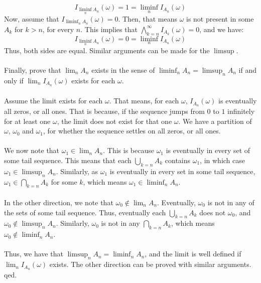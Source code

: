 \documentclass[12pt,a4paper]{article}
\newcommand{\1}[1]{\mathbbm{1}\left\{ #1 \right\}}
\begin{document}
$$
	I_{\liminf_n A_n}(\omega) = 1 = \liminf_n I_{A_n}(\omega)
$$
Now, assume that $I_{\liminf_n A_n}(\omega) = 0$. Then, that means $\omega$ is not present in some $A_k$ for $k > n$, for every $n$. This implies that $\bigwedge_{k=n}^\infty I_{A_k}(\omega) = 0$, and we have:
$$
	I_{\liminf_n A_n}(\omega) = 0 = \liminf_n I_{A_n}(\omega)
$$
Thus, both sides are equal. Similar arguments can be made for the $\limsup$.
\\\\
Finally, prove that $\lim_n A_n$ exists in the sense of $\liminf_n A_n = \limsup_n A_n$ if and only if $\lim_n I_{A_n}(\omega)$ exists for each $\omega$.
\\\\
Assume the limit exists for each $\omega$. That means, for each $\omega$, $I_{A_n}(\omega)$ is eventually all zeros, or all ones. That is because, if the sequence jumps from $0$ to $1$ infinitely for at least one $\omega$, the limit does not exist for that one $\omega$. We have a partition of $\omega$, $\omega_0$ and $\omega_1$, for whether the sequence settles on all zeros, or all ones.
\\\\
We now note that $\omega_1 \in \lim_n A_n$. This is because $\omega_1$ is eventually in every set of some tail sequence. This means that each $\bigcup_{k=n} A_k$ contains $\omega_1$, in which case $\omega_1 \in \limsup_n A_n$. Similarly, as $\omega_1$ is eventually in every set in some tail sequence, $\omega_1 \in \bigcap_{k=n} A_k$ for some $k$, which means $\omega_1 \in \liminf_n A_n$.
\\\\
In the other direction, we note that $\omega_0 \not\in \lim_n A_n$. Eventually, $\omega_0$ is not in any of the sets of some tail sequence. Thus, eventually each $\bigcup_{k=n} A_k$ does not $\omega_0$, and $\omega_0 \not\in \limsup_n A_n$. Similarly, $\omega_0$ is not in any $\bigcap_{k=n} A_k$, which means $\omega_0 \not\in \liminf_n A_n$.
\\\\
Thus, we have that $\limsup_n A_n = \liminf_n A_n$, and the limit is well defined if $\lim_n I_{A_n}(\omega)$ exists. The other direction can be proved with similar arguments. qed.
\end{document}
